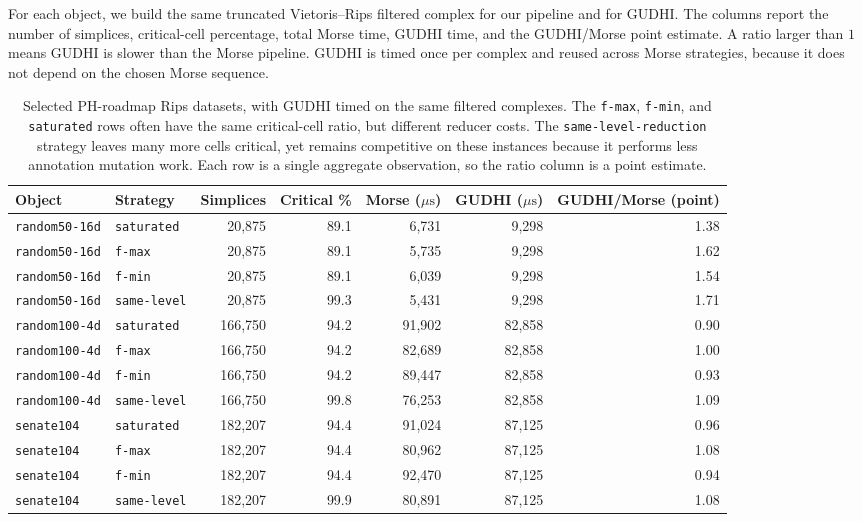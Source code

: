 \documentclass[11pt]{article}
\newcommand{\us}{\ensuremath{\mu\mathrm{s}}}
\newcommand{\slred}{\texttt{same-level}}
\begin{document}
For each object, we build the same truncated Vietoris--Rips filtered complex for our
pipeline and for GUDHI.  The columns report the number of simplices, critical-cell
percentage, total Morse time, GUDHI time, and the GUDHI/Morse point estimate.  A ratio
larger than $1$ means GUDHI is slower than the Morse pipeline.  GUDHI is timed once per complex and
reused across Morse strategies, because it does not depend on the chosen Morse sequence.

\begin{table}[ht]
\centering
\scriptsize
\setlength{\tabcolsep}{2pt}
\begin{tabular}{llrrrrr}
\toprule
Object & Strategy & Simplices & Critical \% & Morse (\us) & GUDHI (\us) & GUDHI/Morse (point) \\
\midrule
\texttt{random50-16d} & \texttt{saturated} & 20,875 & 89.1 & 6,731 & 9,298 & 1.38 \\
\texttt{random50-16d} & \texttt{f-max} & 20,875 & 89.1 & 5,735 & 9,298 & 1.62 \\
\texttt{random50-16d} & \texttt{f-min} & 20,875 & 89.1 & 6,039 & 9,298 & 1.54 \\
\texttt{random50-16d} & \slred & 20,875 & 99.3 & 5,431 & 9,298 & 1.71 \\
\midrule
\texttt{random100-4d} & \texttt{saturated} & 166,750 & 94.2 & 91,902 & 82,858 & 0.90 \\
\texttt{random100-4d} & \texttt{f-max} & 166,750 & 94.2 & 82,689 & 82,858 & 1.00 \\
\texttt{random100-4d} & \texttt{f-min} & 166,750 & 94.2 & 89,447 & 82,858 & 0.93 \\
\texttt{random100-4d} & \slred & 166,750 & 99.8 & 76,253 & 82,858 & 1.09 \\
\midrule
\texttt{senate104} & \texttt{saturated} & 182,207 & 94.4 & 91,024 & 87,125 & 0.96 \\
\texttt{senate104} & \texttt{f-max} & 182,207 & 94.4 & 80,962 & 87,125 & 1.08 \\
\texttt{senate104} & \texttt{f-min} & 182,207 & 94.4 & 92,470 & 87,125 & 0.94 \\
\texttt{senate104} & \slred & 182,207 & 99.9 & 80,891 & 87,125 & 1.08 \\
\bottomrule
\end{tabular}
\caption{Selected PH-roadmap Rips datasets, with GUDHI timed on the same filtered
complexes.  The \texttt{f-max}, \texttt{f-min}, and \texttt{saturated} rows often have
the same critical-cell ratio, but different reducer costs.  The
\texttt{same-level-reduction} strategy leaves many more cells critical, yet remains
competitive on these instances because it performs less annotation mutation work.  Each
row is a single aggregate observation, so the ratio column is a point estimate.}
\label{tab:roadmap-sat-reduction}
\end{table}
\end{document}
